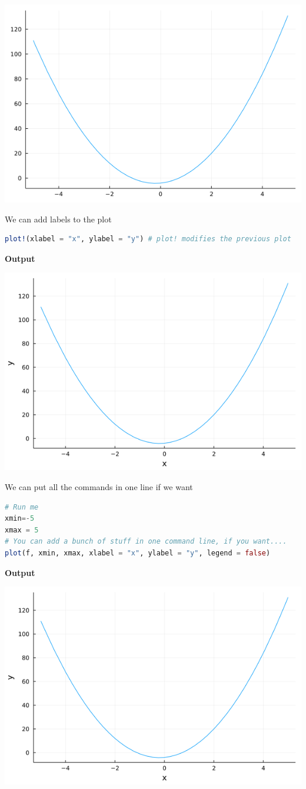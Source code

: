 	\begin{center}
\includegraphics[width=0.5\columnwidth]{graphics/Chap02/Lab01_QuadraticNoLabels.png}
\end{center}

We can add labels to the plot
\begin{lstlisting}[language=Julia,style=mystyle]
plot!(xlabel = "x", ylabel = "y") # plot! modifies the previous plot
\end{lstlisting}

\textbf{Output} 

	\begin{center}
\includegraphics[width=0.5\columnwidth]{graphics/Chap02/Lab01_QuadraticWithLabels.png}
\end{center}


We can put all the commands in one line if we want
\begin{lstlisting}[language=Julia,style=mystyle]
# Run me
xmin=-5
xmax = 5
# You can add a bunch of stuff in one command line, if you want....
plot(f, xmin, xmax, xlabel = "x", ylabel = "y", legend = false) 
\end{lstlisting}

\textbf{Output} 

	\begin{center}
\includegraphics[width=0.5\columnwidth]{graphics/Chap02/Lab01_QuadraticWithLabels.png}
\end{center}



